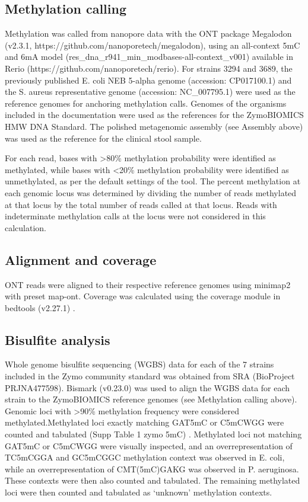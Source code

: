 \subsection{Methylation calling}
\label{sec:methods}

Methylation was called from nanopore data with the ONT package Megalodon (v2.3.1, https://github.com/nanoporetech/megalodon), using an all-context 5mC and 6mA model (res\_dna\_r941\_min\_modbases-all-context\_v001) available in Rerio (https://github.com/nanoporetech/rerio). For strains 3294 and 3689, the previously published E. coli NEB 5-alpha genome (accession: CP017100.1) and the S. aureus representative genome (accession: NC\_007795.1) were used as the reference genomes for anchoring methylation calls. Genomes of the organisms included in the documentation were used as the references for the ZymoBIOMICS HMW DNA Standard. The polished metagenomic assembly (see Assembly above) was used as the reference for the clinical stool sample.

For each read, bases with >80\% methylation probability were identified as methylated, while bases with <20\% methylation probability were identified as unmethylated, as per the default settings of the tool. The percent methylation at each genomic locus was determined by dividing the number of reads methylated at that locus by the total number of reads called at that locus. Reads with indeterminate methylation calls at the locus were not considered in this calculation.

\subsection{Alignment and coverage}
\label{sec:methods}

ONT reads were aligned to their respective reference genomes using minimap2 with preset map-ont. Coverage was calculated using the coverage module in bedtools (v2.27.1) \citep{Quinlan2010-lu}.

\subsection{Bisulfite analysis}
\label{sec:methods}

Whole genome bisulfite sequencing (WGBS) data for each of the 7 strains included in the Zymo community standard was obtained from SRA (BioProject PRJNA477598). Bismark (v0.23.0) \citep{Krueger2011-cu} was used to align the WGBS data for each strain to the ZymoBIOMICS reference genomes (see Methylation calling above). Genomic loci with >90\% methylation frequency were considered methylated.Methylated loci exactly matching GAT5mC or C5mCWGG were counted and tabulated (Supp Table 1 zymo 5mC) . Methylated loci not matching GAT5mC or C5mCWGG were visually inspected, and an overrepresentation of TC5mCGGA and GC5mCGGC methylation context was observed in E. coli, while an overrepresentation of CMT(5mC)GAKG was observed in P. aeruginosa. These contexts were then also counted and tabulated. The remaining methylated loci were then counted and tabulated as ‘unknown’ methylation contexts.

